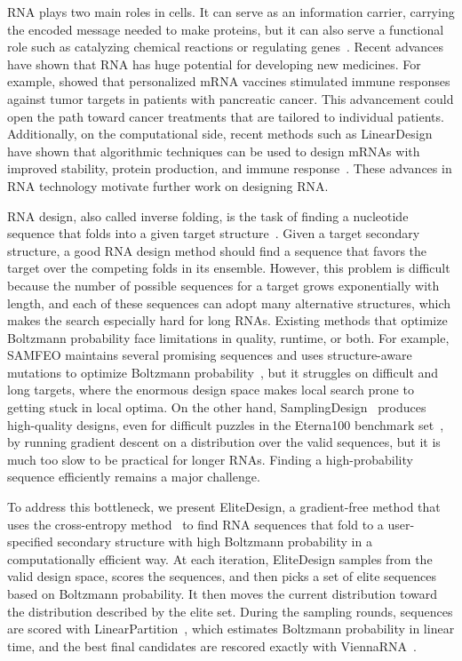 RNA plays two main roles in cells. It can serve as an information
carrier, carrying the encoded message needed to make proteins, but it can also
serve a functional role such as catalyzing chemical reactions or regulating genes~\citep{doudna2002,breaker2012}.
Recent advances have shown that RNA has huge potential for developing new medicines.
For example, \citet{rojas2023} showed that personalized mRNA vaccines stimulated immune responses against tumor
targets in patients with pancreatic cancer. This advancement could open the path toward
cancer treatments that are tailored to individual patients. Additionally, on the computational side,
recent methods such as LinearDesign have shown that algorithmic techniques can be used
to design mRNAs with improved stability, protein production, and immune response~\citep{zhang2023}.
These advances in RNA technology motivate further work on designing RNA.

RNA design, also called inverse folding, is the task of finding a nucleotide
sequence that folds into a given target structure~\citep{hofacker1994,dirks2004}. Given a target secondary structure,
a good RNA design method should find a sequence that favors the target
over the competing folds in its ensemble. However, this problem is difficult because
the number of possible sequences for a target grows exponentially with length,
and each of these sequences can adopt many alternative structures,
which makes the search especially hard for long RNAs. Existing methods that optimize
Boltzmann probability face limitations in quality, runtime, or both. For example,
SAMFEO maintains several promising sequences and uses structure-aware mutations to optimize Boltzmann probability~\citep{zhou2023},
but it struggles on difficult and long targets, where the enormous design space
makes local search prone to getting stuck in local optima.
On the other hand, SamplingDesign~\citep{tang2026} produces high-quality designs, even for difficult puzzles in
the Eterna100 benchmark set~\citep{andersonlee2016}, by running gradient descent on a distribution over the valid sequences, but it is
much too slow to be practical for
longer RNAs. Finding a high-probability sequence efficiently remains a major challenge.

To address this bottleneck, we present EliteDesign, a gradient-free method that uses the cross-entropy method~\citep{rubinstein1999,deboer2005} to
find RNA sequences that fold to a user-specified secondary structure with high Boltzmann probability
in a computationally efficient way.
At each iteration, EliteDesign samples from the valid design space, scores the sequences,
and then picks a set of elite sequences based on Boltzmann probability.
It then moves the current distribution toward the distribution described by the elite
set. During the sampling rounds, sequences are scored with LinearPartition~\citep{zhang2020},
which estimates Boltzmann probability in linear time, and the best final candidates are
rescored exactly with ViennaRNA~\citep{lorenz2011}.

